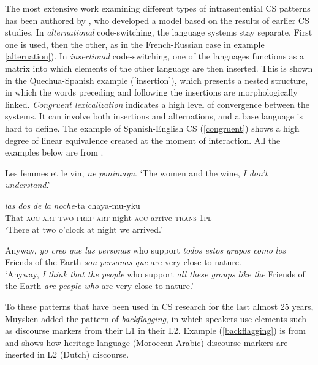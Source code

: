 \documentclass[output=paper]{langscibook}
\begin{document}
The most extensive work examining different types of intrasentential CS patterns has been authored by \textcite{muysken2000,muysken2013language}, who developed a model based on the results of earlier CS studies. In \textit{alternational} code-switching, the language systems stay separate. First one is used, then the other, as in the French-Russian case in example \ref{alternation}). In \textit{insertional} code-switching, one of the languages functions as a matrix into which elements of the other language are then inserted. This is shown in the Quechua-Spanish example (\ref{insertion}), which presents a nested structure, in which the words preceding and following the insertions are morphologically linked. \textit{Congruent lexicalization} indicates a high level of convergence between the systems. It can involve both insertions and alternations, and a base language is hard to define. The example of Spanish-English CS (\ref{congruent}) shows a high degree of linear equivalence created at the moment of interaction.  All the examples below are from \textcite{muysken2000}.

\begin{exe}
\ex\label{alternation}
Les femmes et le vin,  \textit{ne ponimayu}.
\glt `The women and the wine, \textit{I don't understand}.'

\ex \label{insertion}
 \textit{las} \textit{dos} \textit{de} \textit{la} \textit{noche}-ta chaya-mu-yku\\
 That-\textsc{acc} \textsc{art} \textsc{two} \textsc{prep} \textsc{art} night-\textsc{acc} arrive-\textsc{trans}-\textsc{1pl}\\
\trans `There at two o'clock at night we arrived.'


\ex \label{congruent}
Anyway, \textit{yo creo que las personas} who support \textit{todos estos grupos como los} Friends of the Earth \textit{son personas que} are very close to nature.\\
\glt `Anyway, \textit{I think that the people} who support \textit{all these groups like the} Friends of the Earth \textit{are people who} are very close to nature.'
\end{exe}

To these patterns that have been used in CS research for the last almost 25 years, Muysken added the pattern of \textit{backflagging}, in which speakers use elements such as discourse markers from their L1 in their L2. Example (\ref{backflagging}) is from \textcite{muysken2013language} and shows how heritage language (Moroccan Arabic) discourse markers are inserted in L2 (Dutch) discourse. 
\end{document}
